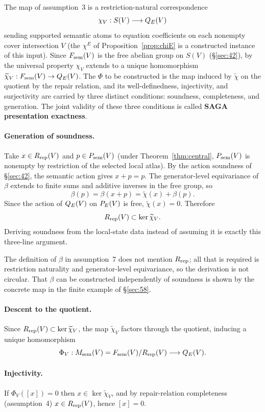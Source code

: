 The map of assumption~3 is a restriction-natural correspondence
\[
\chi_V:S(V)\longrightarrow Q_{E}(V)
\]
sending supported semantic atoms to equation coefficients on each
nonempty cover intersection $V$ (the $\chi^E$ of
Proposition~\ref{prop:chiE} is a constructed instance of this input).
Since $F_{\mathrm{sem}}(V)$ is the free abelian group on $S(V)$ (\S\ref{sec:42}),
by the universal property $\chi_V$ extends to a unique homomorphism
$\widetilde\chi_V:F_{\mathrm{sem}}(V)\to Q_{E}(V)$. The $\Phi$ to be constructed is
the map induced by $\widetilde\chi$ on the quotient by the repair
relation, and its well-definedness, injectivity, and surjectivity are
carried by three distinct conditions: soundness, completeness, and
generation. The joint validity of these three conditions is called
\textbf{SAGA presentation exactness}.

\paragraph{Generation of soundness.}
Take $x\in R_{\mathrm{rep}}(V)$ and $p\in P_{\mathrm{sem}}(V)$ (under
Theorem~\ref{thm:central}, $P_{\mathrm{sem}}(V)$ is nonempty by restriction of the
selected local atlas). By the action soundness of \S\ref{sec:42}, the
semantic action gives $x+p=p$. The generator-level equivariance of
$\beta$ extends to finite sums and additive inverses in the free group,
so
\[
\beta(p)=\beta(x+p)=\widetilde\chi(x)+\beta(p).
\]
Since the action of $Q_{E}(V)$ on $P_{E}(V)$ is free, $\widetilde\chi(x)=0$.
Therefore
\[
R_{\mathrm{rep}}(V)\subset\ker\widetilde\chi_V.
\]
Deriving soundness from the local-state data instead of assuming it is
exactly this three-line argument.

The definition of $\beta$ in assumption~7 does not mention $R_{\mathrm{rep}}$;
all that is required is restriction naturality and generator-level
equivariance, so the derivation is not circular. That $\beta$ can be
constructed independently of soundness is shown by the concrete map in
the finite example of \S\ref{sec:58}.

\paragraph{Descent to the quotient.}
Since $R_{\mathrm{rep}}(V)\subset\ker\widetilde\chi_V$, the map
$\widetilde\chi_V$ factors through the quotient, inducing a unique
homomorphism
\[
\Phi_V:
M_{\mathrm{sem}}(V)=F_{\mathrm{sem}}(V)/R_{\mathrm{rep}}(V)
\longrightarrow Q_{E}(V).
\]

\paragraph{Injectivity.}
If $\Phi_V([x])=0$ then $x\in\ker\widetilde\chi_V$, and by
repair-relation completeness (assumption~4) $x\in R_{\mathrm{rep}}(V)$, hence
$[x]=0$.


